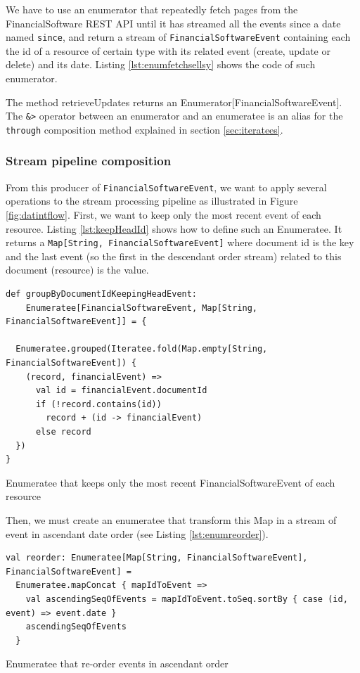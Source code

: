 We have to use an enumerator that repeatedly fetch pages from the FinancialSoftware REST API until it has streamed all the events since a date named \verb|since|, and return
a stream of \verb|FinancialSoftwareEvent| containing each the id of a resource of certain type with its related event (create, update or delete) and its date. 
Listing \ref{lst:enumfetchsellsy} shows the code of such enumerator.

The method retrieveUpdates returns an Enumerator[FinancialSoftwareEvent]. The \verb|&>| operator between an enumerator and an enumeratee
is an alias for the \verb|through| composition method explained in section \ref{sec:iteratees}.

\subsubsection{Stream pipeline composition}

From this producer of \verb|FinancialSoftwareEvent|, we want to apply several operations to the stream processing pipeline as illustrated in Figure \ref{fig:datintflow}. 
First, we want to keep only the most recent event of each resource. Listing \ref{lst:keepHeadId} shows how to define such an Enumeratee. It returns a 
\verb|Map[String, FinancialSoftwareEvent]| where document id is the key and the last event (so the first in the descendant order stream) related to this document (resource)
is the value.

\begin{listing}[h]
\begin{verbatim}
def groupByDocumentIdKeepingHeadEvent: 
    Enumeratee[FinancialSoftwareEvent, Map[String, FinancialSoftwareEvent]] = {

  Enumeratee.grouped(Iteratee.fold(Map.empty[String, FinancialSoftwareEvent]) { 
    (record, financialEvent) =>
      val id = financialEvent.documentId
      if (!record.contains(id))
        record + (id -> financialEvent)
      else record
  })
}
\end{verbatim}
\caption{Enumeratee that keeps only the most recent FinancialSoftwareEvent of each resource}
\label{lst:keepHeadId}
\end{listing}

Then, we must create an enumeratee that transform this Map in a stream of event in ascendant date order (see Listing \ref{lst:enumreorder}).

\begin{listing}[h]
\begin{verbatim}
val reorder: Enumeratee[Map[String, FinancialSoftwareEvent], FinancialSoftwareEvent] = 
  Enumeratee.mapConcat { mapIdToEvent => 
    val ascendingSeqOfEvents = mapIdToEvent.toSeq.sortBy { case (id, event) => event.date }
    ascendingSeqOfEvents
  }
\end{verbatim}
\caption{Enumeratee that re-order events in ascendant order}
\label{lst:enumreorder}
\end{listing}

